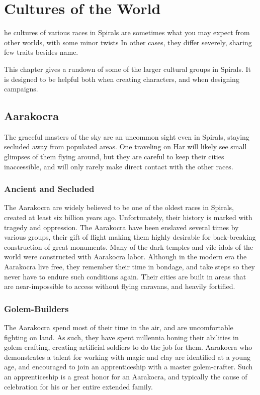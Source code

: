 \chapter{Cultures of the World}
he cultures of various races in Spirals are sometimes what you may expect from other worlds, with some minor twists
In other cases, they differ severely, sharing few traits besides name.

This chapter gives a rundown of some of the larger cultural groups in Spirals.
It is designed to be helpful both when creating characters, and when designing campaigns.


\begin{multicols}{2}
\section{Aarakocra}
The graceful masters of the sky are an uncommon sight even in Spirals, staying secluded away from populated areas.
One traveling on Har will likely see small glimpses of them flying around, but they are careful to keep their cities inaccessible, and will only rarely make direct contact with the other races.

\subsection{Ancient and Secluded}
The Aarakocra are widely believed to be one of the oldest races in Spirals, created at least six billion years ago.
Unfortunately, their history is marked with tragedy and oppression.
The Aarakocra have been enslaved several times by various groups, their gift of flight making them highly desirable for back-breaking construction of great monuments.
Many of the dark temples and vile idols of the world were constructed with Aarakocra labor.
Although in the modern era the Aarakocra live free, they remember their time in bondage, and take steps so they never have to endure such conditions again.
Their cities are built in areas that are near-impossible to access without flying caravans, and heavily fortified.

\subsection{Golem-Builders}
The Aarakocra spend most of their time in the air, and are uncomfortable fighting on land.
As such, they have spent millennia honing their abilities in golem-crafting, creating artificial soldiers to do the job for them.
Aarakocra who demonstrates a talent for working with magic and clay are identified at a young age, and encouraged to join an apprenticeship with a master golem-crafter.
Such an apprenticeship is a great honor for an Aarakocra, and typically the cause of celebration for his or her entire extended family.


\end{multicols}

